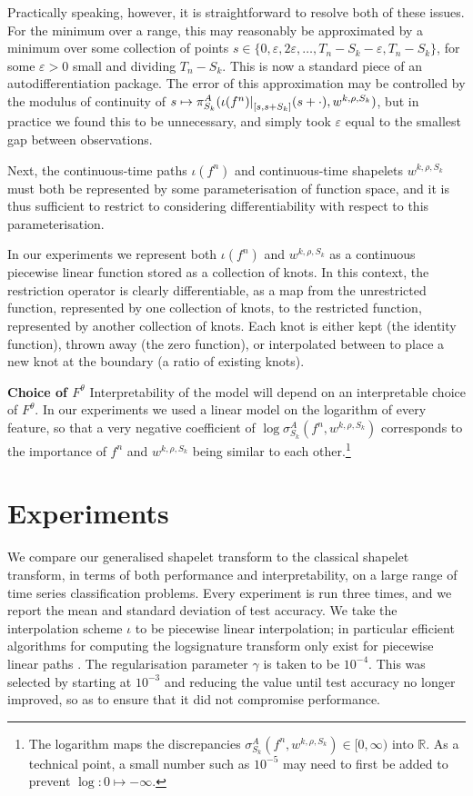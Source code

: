 \documentclass{article}
\theoremstyle{plain}
\theoremstyle{definition}
\newcommand{\reals}{\mathbb{R}}
\newcommand{\restr}[2]{{\left.\kern-\nulldelimiterspace #1 \right|_{#2}}}
\newcommand{\boldheading}[1]{

\textbf{#1}\quad}
\begin{document}
	Practically speaking, however, it is straightforward to resolve both of these issues. For the minimum over a range, this may reasonably be approximated by a minimum over some collection of points $s \in \{0, \varepsilon, 2 \varepsilon, \ldots, T_n - S_k - \varepsilon, T_n - S_k\}$, for some $\varepsilon > 0$ small and dividing $T_n - S_k$. This is now a standard piece of an autodifferentiation package. The error of this approximation may be controlled by the modulus of continuity of $s \mapsto \pi^A_{S_k}(\restr{\iota(f^n)}{[s, s + S_k]}(s + \cdot), w^{k, \rho, S_k})$, but in practice we found this to be unnecessary, and simply took $\varepsilon$ equal to the smallest gap between observations.
	
	Next, the continuous-time paths $\iota(f^n)$ and continuous-time shapelets $w^{k, \rho, S_k}$ must both be represented by some parameterisation of function space, and it is thus sufficient to restrict to considering differentiability with respect to this parameterisation.
	
	In our experiments we represent both $\iota(f^n)$ and $w^{k, \rho, S_k}$ as a continuous piecewise linear function stored as a collection of knots. In this context, the restriction operator is clearly differentiable, as a map from the unrestricted function, represented by one collection of knots, to the restricted function, represented by another collection of knots. Each knot is either kept (the identity function), thrown away (the zero function), or interpolated between to place a new knot at the boundary (a ratio of existing knots).

	
	\boldheading{Choice of $F^\theta$}\label{section:choice-of-f}
	Interpretability of the model will depend on an interpretable choice of $F^\theta$. In our experiments we used a linear model on the logarithm of every feature, so that a very negative coefficient of $\log \sigma^A_{S_k}(f^n, w^{k, \rho, S_k})$ corresponds to the importance of $f^n$ and $w^{k, \rho, S_k}$ being similar to each other.\footnote{The logarithm maps the discrepancies $\sigma^A_{S_k}(f^n, w^{k, \rho, S_k}) \in [0, \infty)$ into $\reals$. As a technical point, a small number such as $10^{-5}$ may need to first be added to prevent $\log \colon 0 \mapsto -\infty$.}
	
	
\section{Experiments}
We compare our generalised shapelet transform to the classical shapelet transform, in terms of both performance and interpretability, on a large range of time series classification problems. Every experiment is run three times, and we report the mean and standard deviation of test accuracy. We take the interpolation scheme $\iota$ to be piecewise linear interpolation; in particular efficient algorithms for computing the logsignature transform only exist for piecewise linear paths \cite{signatory}. The regularisation parameter $\gamma$ is taken to be $10^{-4}$. This was selected by starting at $10^{-3}$ and reducing the value until test accuracy no longer improved, so as to ensure that it did not compromise performance.
\end{document}
